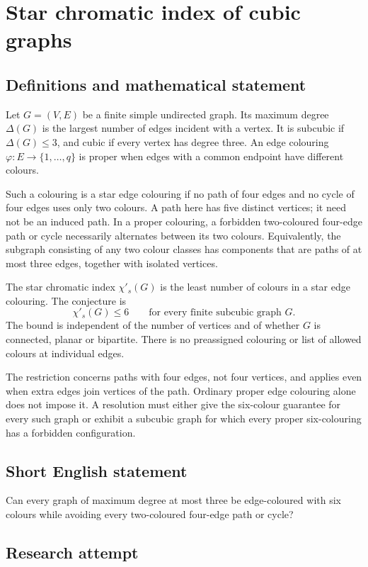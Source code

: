 \documentclass[11pt,a4paper]{article}
\begin{document}
\section*{Star chromatic index of cubic graphs}\label{statement}

\subsection{Definitions and mathematical statement}
Let $G=(V,E)$ be a finite simple undirected graph. Its maximum degree
$\Delta(G)$ is the largest number of edges incident with a vertex.
It is subcubic if $\Delta(G)\le3$, and cubic if every vertex has degree
three. An edge colouring $\varphi:E\to\{1,\ldots,q\}$ is proper when
edges with a common endpoint have different colours.

Such a colouring is a star edge colouring if no path of four edges and
no cycle of four edges uses only two colours. A path here has five
distinct vertices; it need not be an induced path. In a proper colouring,
a forbidden two-coloured four-edge path or cycle necessarily alternates
between its two colours. Equivalently, the subgraph consisting of any
two colour classes has components that are paths of at most three edges,
together with isolated vertices.

The star chromatic index $\chi'_s(G)$ is the least number of colours
in a star edge colouring. The conjecture is
\[
 \chi'_s(G)\le6\qquad\text{for every finite subcubic graph }G.
\]
The bound is independent of the number of vertices and of whether $G$
is connected, planar or bipartite. There is no preassigned colouring or
list of allowed colours at individual edges.

The restriction concerns paths with four edges, not four vertices, and
applies even when extra edges join vertices of the path. Ordinary proper
edge colouring alone does not impose it. A resolution must either give
the six-colour guarantee for every such graph or exhibit a subcubic
graph for which every proper six-colouring has a forbidden configuration.
\subsection{Short English statement}
Can every graph of maximum degree at most three be edge-coloured with six colours while avoiding every two-coloured four-edge path or cycle?
\subsection{Research attempt}
\end{document}
